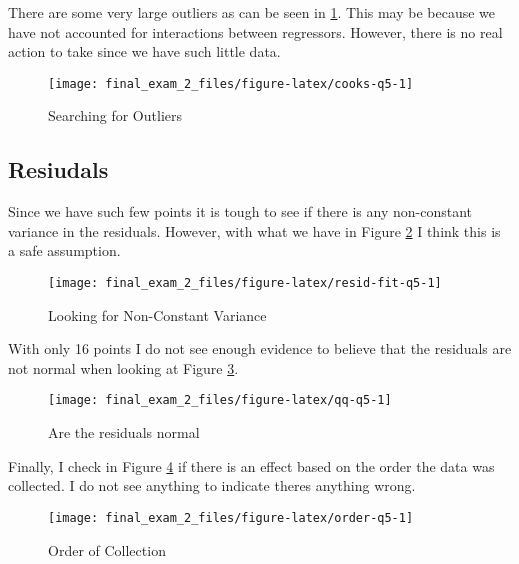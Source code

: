 \documentclass[]{book}
\begin{document}
There are some very large outliers as can be seen in \ref{fig:cooks-q5}. This may be because we have not accounted for interactions between regressors. However, there is no real action to take since we have such little data.

\begin{figure}

{\centering \texttt{[image: final\_exam\_2\_files/figure-latex/cooks-q5-1]} 

}

\caption{Searching for Outliers}\label{fig:cooks-q5}
\end{figure}

\hypertarget{resiudals}{%
\subsection{Resiudals}\label{resiudals}}

Since we have such few points it is tough to see if there is any non-constant variance in the residuals. However, with what we have in Figure \ref{fig:resid-fit-q5} I think this is a safe assumption.

\begin{figure}

{\centering \texttt{[image: final\_exam\_2\_files/figure-latex/resid-fit-q5-1]} 

}

\caption{Looking for Non-Constant Variance}\label{fig:resid-fit-q5}
\end{figure}

With only 16 points I do not see enough evidence to believe that the residuals are not normal when looking at Figure \ref{fig:qq-q5}.

\begin{figure}

{\centering \texttt{[image: final\_exam\_2\_files/figure-latex/qq-q5-1]} 

}

\caption{Are the residuals normal}\label{fig:qq-q5}
\end{figure}

Finally, I check in Figure \ref{fig:order-q5} if there is an effect based on the order the data was collected. I do not see anything to indicate theres anything wrong.

\begin{figure}

{\centering \texttt{[image: final\_exam\_2\_files/figure-latex/order-q5-1]} 

}

\caption{Order of Collection}\label{fig:order-q5}
\end{figure}
\end{document}
